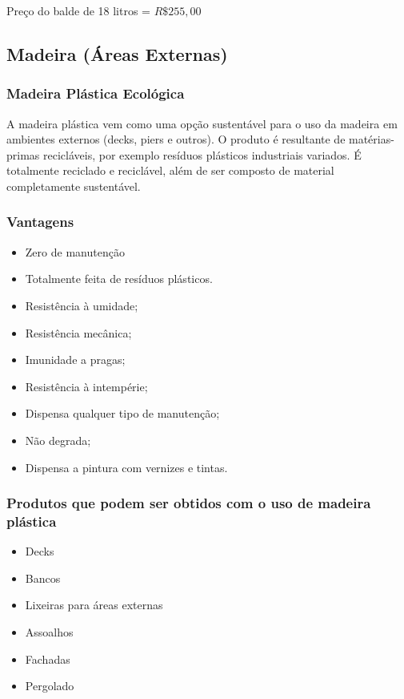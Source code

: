 	Preço do balde de 18 litros = $R\$ 255,00$


\subsection{Madeira (Áreas Externas) }

\subsubsection*{\textbf{Madeira Plástica Ecológica}}
	
A madeira plástica vem como uma opção sustentável para o uso da madeira em ambientes externos (decks, piers e outros). O produto é resultante de matérias-primas recicláveis, por exemplo resíduos plásticos industriais variados\cite{EcoCasa}. É totalmente reciclado e reciclável, além de ser composto de material completamente sustentável\cite{ReWood}.

\subsubsection*{\textbf{Vantagens}}
	
	\begin{itemize}
		\item Zero de manutenção
		\item Totalmente feita de resíduos plásticos.
		\item Resistência à umidade;
		\item Resistência mecânica;
		\item Imunidade a pragas;
		\item Resistência à intempérie;
		\item Dispensa qualquer tipo de manutenção;
		\item Não degrada;
		\item Dispensa a pintura com vernizes e tintas.
	\end{itemize}

\subsubsection*{\textbf{Produtos que podem ser obtidos com o uso de madeira plástica}}
	
	\begin{itemize}
		\item Decks
		\item Bancos 
		\item Lixeiras para áreas externas
		\item Assoalhos
		\item Fachadas
		\item Pergolado
	\end{itemize}

